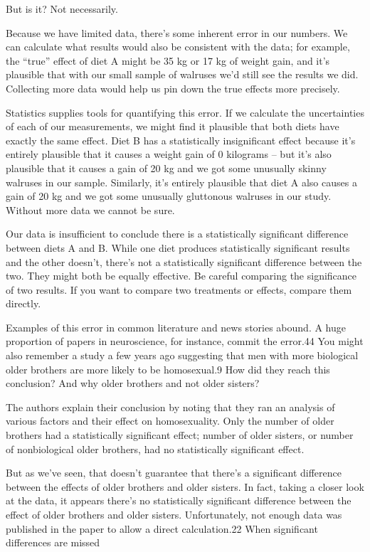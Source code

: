 But is it? Not necessarily.

Because we have limited data, there’s some inherent error in our numbers. We can calculate what results would also be consistent with the data; for example, the “true” effect of diet A might be 35 kg or 17 kg of weight gain, and it’s plausible that with our small sample of walruses we’d still see the results we did. Collecting more data would help us pin down the true effects more precisely.

Statistics supplies tools for quantifying this error. If we calculate the uncertainties of each of our measurements, we might find it plausible that both diets have exactly the same effect. Diet B has a statistically insignificant effect because it’s entirely plausible that it causes a weight gain of 0 kilograms – but it’s also plausible that it causes a gain of 20 kg and we got some unusually skinny walruses in our sample. Similarly, it’s entirely plausible that diet A also causes a gain of 20 kg and we got some unusually gluttonous walruses in our study. Without more data we cannot be sure.

Our data is insufficient to conclude there is a statistically significant difference between diets A and B. While one diet produces statistically significant results and the other doesn’t, there’s not a statistically significant difference between the two. They might both be equally effective. Be careful comparing the significance of two results. If you want to compare two treatments or effects, compare them directly.

Examples of this error in common literature and news stories abound. A huge proportion of papers in neuroscience, for instance, commit the error.44 You might also remember a study a few years ago suggesting that men with more biological older brothers are more likely to be homosexual.9 How did they reach this conclusion? And why older brothers and not older sisters?

The authors explain their conclusion by noting that they ran an analysis of various factors and their effect on homosexuality. Only the number of older brothers had a statistically significant effect; number of older sisters, or number of nonbiological older brothers, had no statistically significant effect.

But as we’ve seen, that doesn’t guarantee that there’s a significant difference between the effects of older brothers and older sisters. In fact, taking a closer look at the data, it appears there’s no statistically significant difference between the effect of older brothers and older sisters. Unfortunately, not enough data was published in the paper to allow a direct calculation.22
When significant differences are missed

